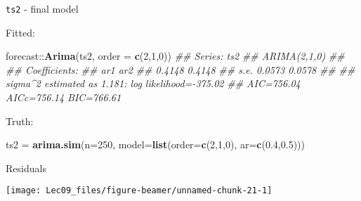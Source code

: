 \documentclass[11pt,ignorenonframetext,]{beamer}
\newenvironment{Shaded}{}{}
\newcommand{\CommentTok}[1]{\textcolor[rgb]{0.38,0.63,0.69}{\textit{#1}}}
\newcommand{\DataTypeTok}[1]{\textcolor[rgb]{0.56,0.13,0.00}{#1}}
\newcommand{\DecValTok}[1]{\textcolor[rgb]{0.25,0.63,0.44}{#1}}
\newcommand{\FloatTok}[1]{\textcolor[rgb]{0.25,0.63,0.44}{#1}}
\newcommand{\KeywordTok}[1]{\textcolor[rgb]{0.00,0.44,0.13}{\textbf{#1}}}
\newcommand{\NormalTok}[1]{#1}
\newcommand{\OperatorTok}[1]{\textcolor[rgb]{0.40,0.40,0.40}{#1}}
\newcommand{\StringTok}[1]{\textcolor[rgb]{0.25,0.44,0.63}{#1}}
\let\oldShaded\Shaded
\let\endoldShaded\endShaded
\renewenvironment{Shaded}{\footnotesize\begin{spacing}{0.9}\oldShaded}{\endoldShaded\end{spacing}}
\let\oldverbatim\verbatim
\let\endoldverbatim\endverbatim
\newcommand{\scriptoutput}{
  \renewenvironment{Shaded}{\scriptsize\begin{spacing}{0.9}\oldShaded}{\endoldShaded\end{spacing}}
  \renewenvironment{verbatim}{\scriptsize\begin{spacing}{0.9}\oldverbatim}{\endoldverbatim\end{spacing}}
}
\begin{document}
\begin{frame}[fragile,t]{\texttt{ts2} - final model}
\protect\hypertarget{ts2---final-model}{}

\scriptoutput

Fitted:

\begin{Shaded}
\begin{Highlighting}[]
\NormalTok{forecast}\OperatorTok{::}\KeywordTok{Arima}\NormalTok{(ts2, }\DataTypeTok{order =} \KeywordTok{c}\NormalTok{(}\DecValTok{2}\NormalTok{,}\DecValTok{1}\NormalTok{,}\DecValTok{0}\NormalTok{))}
\CommentTok{## Series: ts2 }
\CommentTok{## ARIMA(2,1,0) }
\CommentTok{## }
\CommentTok{## Coefficients:}
\CommentTok{##          ar1     ar2}
\CommentTok{##       0.4148  0.4148}
\CommentTok{## s.e.  0.0573  0.0578}
\CommentTok{## }
\CommentTok{## sigma^2 estimated as 1.181:  log likelihood=-375.02}
\CommentTok{## AIC=756.04   AICc=756.14   BIC=766.61}
\end{Highlighting}
\end{Shaded}

Truth:

\begin{Shaded}
\begin{Highlighting}[]
\NormalTok{ts2 =}\StringTok{ }\KeywordTok{arima.sim}\NormalTok{(}\DataTypeTok{n=}\DecValTok{250}\NormalTok{, }\DataTypeTok{model=}\KeywordTok{list}\NormalTok{(}\DataTypeTok{order=}\KeywordTok{c}\NormalTok{(}\DecValTok{2}\NormalTok{,}\DecValTok{1}\NormalTok{,}\DecValTok{0}\NormalTok{), }\DataTypeTok{ar=}\KeywordTok{c}\NormalTok{(}\FloatTok{0.4}\NormalTok{,}\FloatTok{0.5}\NormalTok{))) }
\end{Highlighting}
\end{Shaded}

\end{frame}

\begin{frame}{Residuals}
\protect\hypertarget{residuals}{}

\begin{center}\texttt{[image: Lec09\_files/figure-beamer/unnamed-chunk-21-1]} \end{center}

\end{frame}
\end{document}
